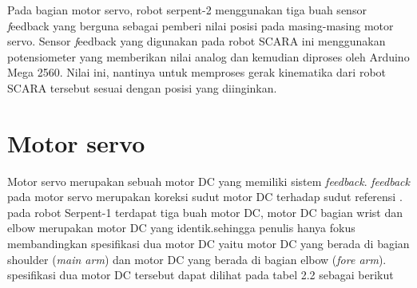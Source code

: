 \begin{table}[H]
	\centering
	\caption{Spesifikasi Robot Serpent-2}
		\end{table}
		
		Pada bagian motor servo, robot serpent-2 menggunakan tiga buah sensor \emph feedback yang berguna sebagai pemberi nilai posisi pada masing-masing motor servo. Sensor \emph feedback yang digunakan pada robot SCARA ini menggunakan potensiometer yang memberikan nilai analog dan kemudian diproses oleh Arduino Mega 2560. Nilai ini, nantinya untuk memproses gerak kinematika dari robot SCARA tersebut sesuai dengan posisi yang diinginkan.
		
		
		
		\section{Motor servo}
		Motor servo merupakan sebuah motor DC yang memiliki sistem \textit{feedback}. \textit{feedback} pada motor servo merupakan koreksi sudut motor DC terhadap sudut referensi \cite{Younkin2002}. pada robot Serpent-1 terdapat tiga buah motor DC, motor DC	 bagian wrist dan elbow merupakan motor DC yang identik.sehingga penulis hanya fokus membandingkan spesifikasi dua motor DC yaitu motor DC yang berada di bagian shoulder (\textit{main arm}) dan motor DC yang berada di bagian elbow (\textit{fore arm}). spesifikasi dua motor DC tersebut dapat dilihat pada tabel 2.2 sebagai berikut
		
